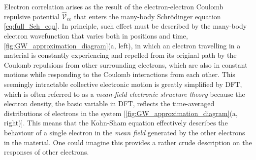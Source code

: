 Electron correlation arises as the result of the electron-electron Coulomb repulsive potential $\hat{\mathcal{V}}_{ee}$ that enters the many-body Schr\"{o}dinger equation \cref{eq:full_Sch_eqn}. In principle, such effect must be described by the many-body electron wavefunction that varies both in positions and time, \cref{fig:GW_approximation_diagram}(a, left), in which an electron travelling in a material is constantly experiencing and repelled from its original path by the Coulomb repulsions from other surrounding electrons, which are also in constant motions while responding to the Coulomb interactions from each other. This seemingly intractable collective electronic motion is greatly simplified by DFT, which is often referred to as a \textit{mean-field electronic structure theory} because the electron density, the basic variable in DFT, reflects the time-averaged distributions of electrons in the system [\cref{fig:GW_approximation_diagram}(a, right)]. This means that the Kohn-Sham equation effectively describes the behaviour of a single electron in the \textit{mean field} generated by the other electrons in the material. One could imagine this provides a rather crude description on the responses of other electrons.

